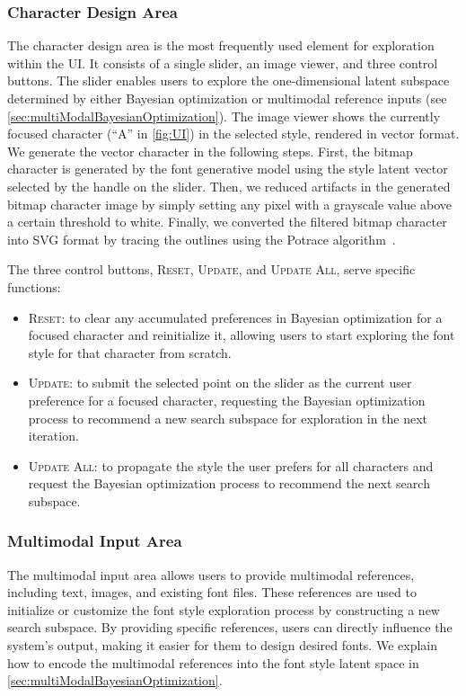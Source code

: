 \subsubsection{Character Design Area}
\label{sec:primaryComponent}
The character design area is the most frequently used element for exploration within the UI.
It consists of a single slider, an image viewer, and three control buttons.
The slider enables users to explore the one-dimensional latent subspace determined by either Bayesian optimization or multimodal reference inputs (see \autoref{sec:multiModalBayesianOptimization}).
The image viewer shows the currently focused character (``A'' in \autoref{fig:UI}) in the selected style, rendered in vector format.
We generate the vector character in the following steps.
First, the bitmap character is generated by the font generative model using the style latent vector selected by the handle on the slider.
Then, we reduced artifacts in the generated bitmap character image by simply setting any pixel with a grayscale value above a certain threshold to white.
Finally, we converted the filtered bitmap character into SVG format by tracing the outlines using the Potrace algorithm~\cite{selinger2003potrace}.

The three control buttons, \textsc{Reset}, \textsc{Update}, and \textsc{Update All}, serve specific functions:
\begin{itemize}
    \item \textsc{Reset}: to clear any accumulated preferences in Bayesian optimization for a focused character and reinitialize it, allowing users to start exploring the font style for that character from scratch.
    \item \textsc{Update}: to submit the selected point on the slider as the current user preference for a focused character, requesting the Bayesian optimization process to recommend a new search subspace for exploration in the next iteration.
    \item \textsc{Update All}: to propagate the style the user prefers for all characters and request the Bayesian optimization process to recommend the next search subspace.
\end{itemize}

\subsubsection{Multimodal Input Area}
\label{sec:multimodalInputComponent}
The multimodal input area allows users to provide multimodal references, including text, images, and existing font files.
These references are used to initialize or customize the font style exploration process by constructing a new search subspace.
By providing specific references, users can directly influence the system's output, making it easier for them to design desired fonts.
We explain how to encode the multimodal references into the font style latent space in \autoref{sec:multiModalBayesianOptimization}.

